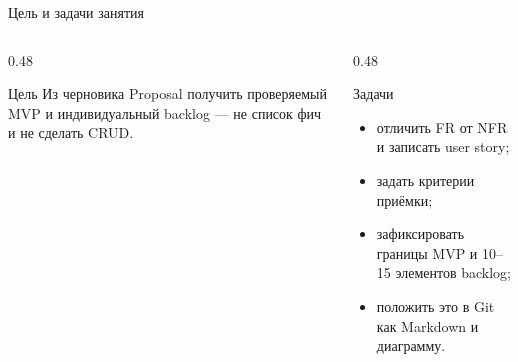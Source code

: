 \begin{frame}{Цель и задачи занятия}
  \vspace{0.3em}
  \begin{columns}[T]
    \begin{column}{0.48\textwidth}
      \begin{block}{Цель}
        Из черновика Proposal получить
        проверяемый MVP и индивидуальный
        backlog --- не список фич
        и не \flqq сделать CRUD\frqq.
      \end{block}
    \end{column}
    \begin{column}{0.48\textwidth}
      \begin{block}{Задачи}
        \begin{itemize}
          \item отличить FR от NFR и записать user story;
          \item задать критерии приёмки;
          \item зафиксировать границы MVP и 10--15 элементов backlog;
          \item положить это в Git как Markdown и диаграмму.
        \end{itemize}
      \end{block}
    \end{column}
  \end{columns}
\end{frame}
